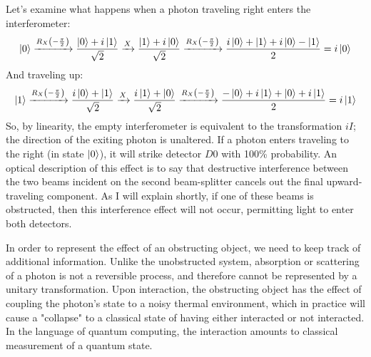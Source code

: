 \documentclass{article}
\begin{document}
Let's examine what happens when a photon traveling right enters the interferometer:
\begin{equation} \label{seq_0}
\ket 0 \xrightarrow{R_X\left(-\frac{\pi}{2}\right)} \frac{\ket 0 + i\ket 1}{\sqrt{2}} \xrightarrow{X} \frac{\ket 1 + i\ket 0}{\sqrt{2}} \xrightarrow{R_X\left(-\frac{\pi}{2}\right)} \frac{i\ket 0 + \ket 1 + i\ket 0 - \ket 1}{2} = i\ket 0
\end{equation}
And traveling up:
\begin{equation} \label{seq_1}
\ket 1 \xrightarrow{R_X\left(-\frac{\pi}{2}\right)} \frac{i\ket 0 + \ket 1}{\sqrt{2}} \xrightarrow{X} \frac{i\ket 1 + \ket 0}{\sqrt{2}} \xrightarrow{R_X\left(-\frac{\pi}{2}\right)} \frac{-\ket 0 + i\ket 1 + \ket 0 + i\ket 1}{2} = i\ket 1
\end{equation}
So, by linearity, the empty interferometer is equivalent to the transformation $iI$; the direction of the exiting photon is unaltered. If a photon enters traveling to the right (in state $\ket 0$), it will strike detector $D0$ with 100\% probability. An optical description of this effect is to say that destructive interference between the two beams incident on the second beam-splitter cancels out the final upward-traveling component. As I will explain shortly, if one of these beams is obstructed, then this interference effect will not occur, permitting light to enter both detectors.

In order to represent the effect of an obstructing object, we need to keep track of additional information. Unlike the unobstructed system, absorption or scattering of a photon is not a reversible process, and therefore cannot be represented by a unitary transformation. Upon interaction, the obstructing object has the effect of coupling the photon's state to a noisy thermal environment, which in practice will cause a "collapse" to a classical state of having either interacted or not interacted. In the language of quantum computing, the interaction amounts to classical measurement of a quantum state.
\end{document}
